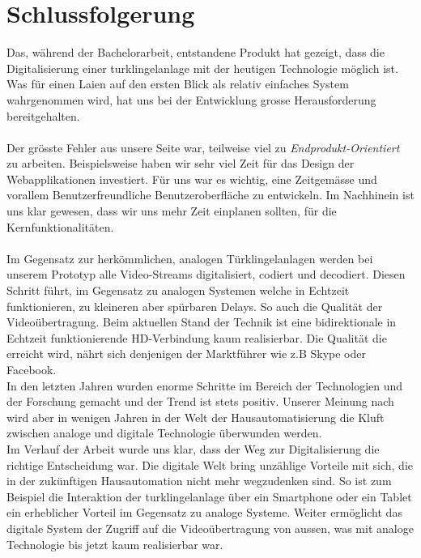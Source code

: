 \newpage

\section{Schlussfolgerung}
\label{sec:schlussfolgerung}
Das, während der Bachelorarbeit, entstandene Produkt hat gezeigt, dass die Digitalisierung einer \gls{turklingelanlage} mit der heutigen Technologie möglich ist. Was für einen Laien auf den ersten Blick als relativ einfaches System wahrgenommen wird, hat uns bei der Entwicklung grosse Herausforderung bereitgehalten. 
\\
\\
Der grösste Fehler aus unsere Seite war, teilweise viel zu \textit{Endprodukt-Orientiert} zu arbeiten. Beispielsweise haben wir sehr viel Zeit für das Design der Webapplikationen investiert. Für uns war es wichtig, eine Zeitgemässe und vorallem Benutzerfreundliche Benutzeroberfläche zu entwickeln. Im Nachhinein ist uns klar gewesen, dass wir uns mehr Zeit einplanen sollten, für die Kernfunktionalitäten. 
\\
\\
Im Gegensatz zur herkömmlichen, analogen Türklingelanlagen werden bei unserem Prototyp alle Video-Streams digitalisiert, codiert und decodiert. Diesen Schritt führt, im Gegensatz zu analogen Systemen welche in Echtzeit funktionieren, zu kleineren aber spürbaren Delays. So auch die Qualität der Videoübertragung. Beim aktuellen Stand der Technik ist eine bidirektionale in Echtzeit funktionierende HD-Verbindung kaum realisierbar. Die Qualität die erreicht wird, nährt sich denjenigen der Marktführer wie z.B Skype oder Facebook.
\\
In den letzten Jahren wurden enorme Schritte im Bereich der Technologien und der Forschung gemacht und der Trend ist stets positiv. Unserer Meinung nach wird aber in wenigen Jahren in der Welt der Hausautomatisierung die Kluft zwischen analoge und digitale Technologie überwunden werden.
\\
Im Verlauf der Arbeit wurde uns klar, dass der Weg zur Digitalisierung die richtige Entscheidung war. Die digitale Welt bring unzählige Vorteile mit sich, die in der zukünftigen Hausautomation nicht mehr wegzudenken sind. So ist zum Beispiel die Interaktion der \gls{turklingelanlage} über ein Smartphone oder ein Tablet ein erheblicher Vorteil im Gegensatz zu analoge Systeme. Weiter ermöglicht das digitale System der Zugriff auf die Videoübertragung von aussen, was mit analoge Technologie bis jetzt kaum realisierbar war.
\\
\newpage

  
